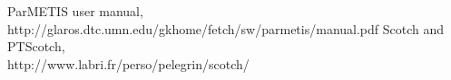 \documentclass[11pt]{article}
\begin{document}

\begin{thebibliography}{9}

 ParMETIS user manual,\\http://glaros.dtc.umn.edu/gkhome/fetch/sw/parmetis/manual.pdf
 Scotch and PTScotch,\\http://www.labri.fr/perso/pelegrin/scotch/


\end{thebibliography}
\end{document}
